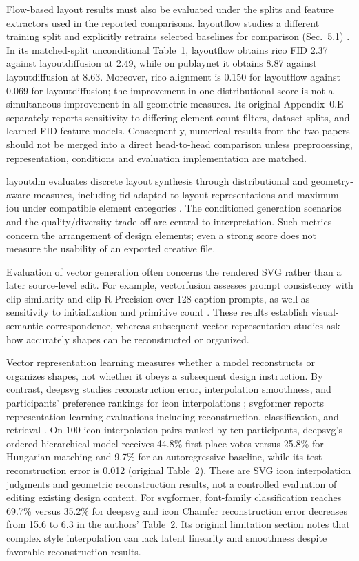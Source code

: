 Flow-based layout results must also be evaluated under the splits and feature extractors used in the reported comparisons.
\ac{layoutflow} studies a different training split and explicitly retrains selected baselines for comparison (Sec.~5.1) \citep{layoutflow2024}.
In its matched-split unconditional Table~1, \ac{layoutflow} obtains \ac{rico} FID 2.37 against \ac{layoutdiffusion} at 2.49, while on \ac{publaynet} it obtains 8.87 against \ac{layoutdiffusion} at 8.63.
Moreover, \ac{rico} alignment is 0.150 for \ac{layoutflow} against 0.069 for \ac{layoutdiffusion}; the improvement in one distributional score is not a simultaneous improvement in all geometric measures.
Its original Appendix~0.E separately reports sensitivity to differing element-count filters, dataset splits, and learned FID feature models.
Consequently, numerical results from the two papers should not be merged into a direct head-to-head comparison unless preprocessing, representation, conditions and evaluation implementation are matched.

\ac{layoutdm} evaluates discrete layout synthesis through distributional and geometry-aware measures, including \ac{fid} adapted to layout representations and maximum \ac{iou} under compatible element categories \citep{layoutdm2023}.
The conditioned generation scenarios and the quality/diversity trade-off are central to interpretation.
Such metrics concern the arrangement of design elements; even a strong score does not measure the usability of an exported creative file.

Evaluation of vector generation often concerns the rendered SVG rather than a later source-level edit.
For example, \ac{vectorfusion} assesses prompt consistency with \ac{clip} similarity and \ac{clip} R-Precision over 128 caption prompts, as well as sensitivity to initialization and primitive count \citep{vectorfusion2023}.
These results establish visual-semantic correspondence, whereas subsequent vector-representation studies ask how accurately shapes can be reconstructed or organized.

Vector representation learning measures whether a model reconstructs or organizes shapes, not whether it obeys a subsequent design instruction.
By contrast, \ac{deepsvg} studies reconstruction error, interpolation smoothness, and participants' preference rankings for icon interpolations \citep{deepsvg2020}; \ac{svgformer} reports representation-learning evaluations including reconstruction, classification, and retrieval \citep{svgformer2023}.
On 100 icon interpolation pairs ranked by ten participants, \ac{deepsvg}'s ordered hierarchical model receives 44.8\% first-place votes versus 25.8\% for Hungarian matching and 9.7\% for an autoregressive baseline, while its test reconstruction error is 0.012 (original Table~2).
These are SVG icon interpolation judgments and geometric reconstruction results, not a controlled evaluation of editing existing design content.
For \ac{svgformer}, font-family classification reaches 69.7\% versus 35.2\% for \ac{deepsvg} and icon Chamfer reconstruction error decreases from 15.6 to 6.3 in the authors' Table~2.
Its original limitation section notes that complex style interpolation can lack latent linearity and smoothness despite favorable reconstruction results.

